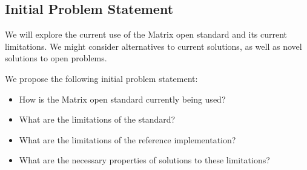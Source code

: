 \subsection{Initial Problem Statement}\label{subsec:initial_problem_statement}
We will explore the current use of the Matrix open standard and its current limitations.
We might consider alternatives to current solutions, as well as novel solutions to open problems.

We propose the following initial problem statement:
\begin{itemize}
    \item How is the Matrix open standard currently being used?
    \item What are the limitations of the standard?
    \item What are the limitations of the reference implementation?
    \item What are the necessary properties of solutions to these limitations?
\end{itemize}